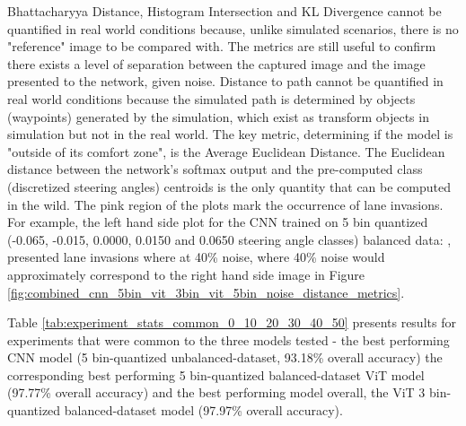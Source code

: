 Bhattacharyya Distance, Histogram Intersection and KL Divergence cannot be quantified in real world conditions because, unlike simulated scenarios, there is no "reference" image to be compared with. The metrics are still useful to confirm there exists a level of separation between the captured image and the image presented to the network, given noise. Distance to path cannot be quantified in real world conditions because the simulated path is determined by objects (waypoints) generated by the simulation, which exist as transform objects in simulation but not in the real world. The key metric, determining if the model is "outside of its comfort zone", is the Average Euclidean Distance. The Euclidean distance between the network's softmax output and the pre-computed class (discretized steering angles) centroids is the only quantity that can be computed in the wild.
The pink region of the plots mark the occurrence of lane invasions. For example, the left hand side plot for the CNN trained on 5 bin quantized (-0.065, -0.015, 0.0000, 0.0150 and 0.0650 steering angle classes) balanced data: , presented lane invasions where at 40\% noise, where 40\% noise would approximately correspond to the right hand side image in Figure \ref{fig:combined_cnn_5bin_vit_3bin_vit_5bin_noise_distance_metrics}. 

Table \ref{tab:experiment_stats_common_0_10_20_30_40_50} presents results for experiments that were common to the three models tested - the best performing CNN model (5 bin-quantized unbalanced-dataset, 93.18\% overall accuracy) the corresponding best performing 5 bin-quantized balanced-dataset ViT model (97.77\% overall accuracy) and the best performing model overall, the ViT 3 bin-quantized balanced-dataset model (97.97\% overall accuracy).

